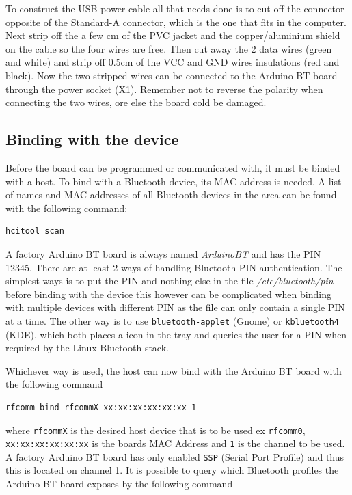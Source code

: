 \documentclass[a4paper, oneside, final]{memoir}
\begin{document}
To construct the USB power cable all that needs done is to cut off the connector
opposite of the Standard-A connector, which is the one that fits in the
computer. Next strip off the a few cm of the PVC jacket and the copper/aluminium
shield on the cable so the four wires are free. Then cut away the 2 data wires
(green and white) and strip off 0.5cm of the VCC and GND wires insulations (red
and black). Now the two stripped wires can be connected to the Arduino BT board
through the power socket (X1). Remember not to reverse the polarity when
connecting the two wires, ore else the board cold be damaged.

\subsection{Binding with the device}

Before the board can be programmed or communicated with, it must be binded with
a host. To bind with a Bluetooth device, its MAC address is needed. A list of
names and MAC addresses of all Bluetooth devices in the area can be found with
the following command:

\begin{verbatim}
hcitool scan
\end{verbatim}

A factory Arduino BT board is always named \textit{ArduinoBT} and has the PIN
12345. There are at least 2 ways of handling Bluetooth PIN authentication. The
simplest ways is to put the PIN and nothing else in the file
\textit{/etc/bluetooth/pin} before binding with the device this however can be
complicated when binding with multiple devices with different PIN as the file
can only contain a single PIN at a time. The other way is to use
\texttt{bluetooth-applet} (Gnome) or \texttt{kbluetooth4} (KDE), which both
places a icon in the tray and queries the user for a PIN when required by the
Linux Bluetooth stack.

Whichever way is used, the host can now bind with the Arduino BT board with the
following command

\begin{verbatim}
rfcomm bind rfcommX xx:xx:xx:xx:xx:xx 1
\end{verbatim}

where \texttt{rfcommX} is the desired host device that is to be used ex
\texttt{rfcomm0}, \texttt{xx:xx:xx:xx:xx:xx} is the boards MAC Address and
\texttt{1} is the channel to be used. A factory Arduino BT board has only
enabled \texttt{SSP} (Serial Port Profile) and thus this is located on channel
1. It is possible to query which Bluetooth profiles the Arduino BT board exposes
by the following command
\end{document}
